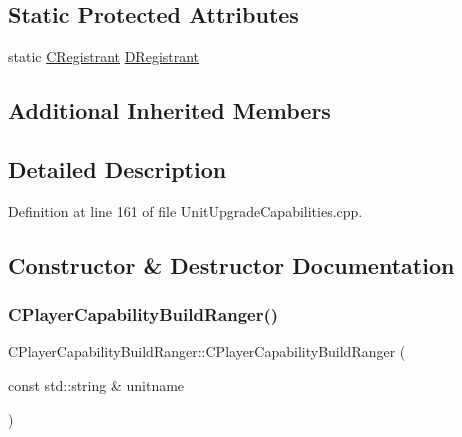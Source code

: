 \subsection*{Static Protected Attributes}
\begin{DoxyCompactItemize}
\item 
static \hyperlink{classCPlayerCapabilityBuildRanger_1_1CRegistrant}{C\+Registrant} \hyperlink{classCPlayerCapabilityBuildRanger_a612ac35d629ed8c0ef38d52d26aee222}{D\+Registrant}
\end{DoxyCompactItemize}
\subsection*{Additional Inherited Members}


\subsection{Detailed Description}


Definition at line 161 of file Unit\+Upgrade\+Capabilities.\+cpp.



\subsection{Constructor \& Destructor Documentation}
\hypertarget{classCPlayerCapabilityBuildRanger_adb3602c8f527157dcd0c9289272a9aa0}{}\label{classCPlayerCapabilityBuildRanger_adb3602c8f527157dcd0c9289272a9aa0} 
\subsubsection{\texorpdfstring{C\+Player\+Capability\+Build\+Ranger()}{CPlayerCapabilityBuildRanger()}}
{\footnotesize\ttfamily C\+Player\+Capability\+Build\+Ranger\+::\+C\+Player\+Capability\+Build\+Ranger (\begin{DoxyParamCaption}\item[{const std\+::string \&}]{unitname }\end{DoxyParamCaption})\hspace{0.3cm}{\ttfamily [protected]}}



